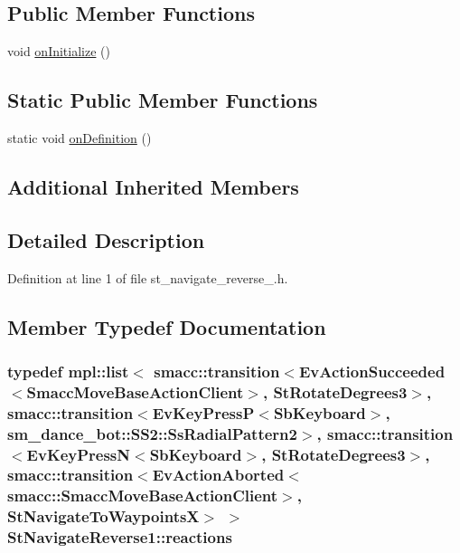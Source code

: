\subsection*{Public Member Functions}
\begin{DoxyCompactItemize}
\item 
void \hyperlink{structStNavigateReverse1_a1931019c55ee6ff0330fdf0ec04f96eb}{on\+Initialize} ()
\end{DoxyCompactItemize}
\subsection*{Static Public Member Functions}
\begin{DoxyCompactItemize}
\item 
static void \hyperlink{structStNavigateReverse1_addd7fc2454ddd7b3b85d30fd6715e0f8}{on\+Definition} ()
\end{DoxyCompactItemize}
\subsection*{Additional Inherited Members}


\subsection{Detailed Description}


Definition at line 1 of file st\+\_\+navigate\+\_\+reverse\+\_.\+h.



\subsection{Member Typedef Documentation}
\subsubsection[{\texorpdfstring{reactions}{reactions}}]{\setlength{\rightskip}{0pt plus 5cm}typedef mpl\+::list$<$ {\bf smacc\+::transition}$<$Ev\+Action\+Succeeded$<$Smacc\+Move\+Base\+Action\+Client$>$, {\bf St\+Rotate\+Degrees3}$>$, {\bf smacc\+::transition}$<$Ev\+Key\+PressP$<$Sb\+Keyboard$>$, {\bf sm\+\_\+dance\+\_\+bot\+::\+S\+S2\+::\+Ss\+Radial\+Pattern2}$>$, {\bf smacc\+::transition}$<$Ev\+Key\+PressN$<$Sb\+Keyboard$>$, {\bf St\+Rotate\+Degrees3}$>$, {\bf smacc\+::transition}$<$Ev\+Action\+Aborted$<${\bf smacc\+::\+Smacc\+Move\+Base\+Action\+Client}$>$, {\bf St\+Navigate\+To\+WaypointsX}$>$ $>$ {\bf St\+Navigate\+Reverse1\+::reactions}}\hypertarget{structStNavigateReverse1_a78b565274abba8fb7d757517b62ed3cf}{}\label{structStNavigateReverse1_a78b565274abba8fb7d757517b62ed3cf}


